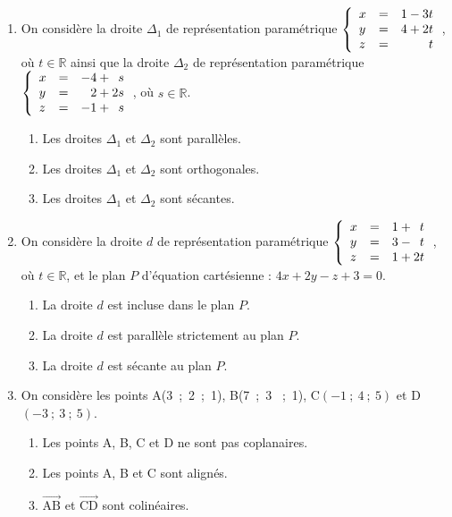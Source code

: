 \documentclass[10pt]{article}
\providecommand{\R}{\mathbb{R}}
\providecommand{\vect}[1]{\overrightarrow{#1}}
\begin{document}
\begin{enumerate}
\item On considère la droite $\Delta_1$ de représentation paramétrique 
$\left\{\begin{array}{l c l}
x &=& 1 - 3t\\
y &=& 4 + 2t\\
z &=&\phantom{4 +2}t
\end{array}\right.$, où $t \in  \R$
ainsi que la droite $\Delta_2$ de représentation paramétrique 
$\left\{\begin{array}{l c l}
x& =& -4 + \phantom{2}s\\
y& =& \phantom{-}2 + 2s\\
z& =& - 1 + \phantom{2}s
\end{array}\right.$, où $s \in \R$.
\begin{enumerate}
\item Les droites $\Delta_1$ et $\Delta_2$ sont parallèles.
\item Les droites $\Delta_1$ et $\Delta_2$ sont orthogonales.
\item Les droites $\Delta_1$ et $\Delta_2$ sont sécantes.
\end{enumerate}
\item On considère la droite $d$ de représentation paramétrique $\left\{\begin{array}{l c l}x&=&1 + \phantom{2}t\\
y &=& 3 - \phantom{2}t\\
z &=& 1 + 2t
\end{array}\right.$, où $t \in \R$,
et le plan $P$ d'équation cartésienne : $4x + 2y - z + 3 = 0.$
	\begin{enumerate}
		\item La droite $d$ est incluse dans le plan $P$.
		\item La droite $d$ est parallèle strictement au plan $P$.
		\item La droite $d$ est sécante au plan $P$.
	\end{enumerate}
\item On considère les points A(3~;~2~;~1), B(7~;~3 ~;~1), C$(-1~;~4~;~5)$ et D$(- 3~;~3~;~5)$.
	\begin{enumerate}
		\item Les points A, B, C et D ne sont pas coplanaires.
		\item Les points A, B et C sont alignés.
		\item $\vect{\text{AB}}$ et $\vect{\text{CD}}$ sont colinéaires.
	\end{enumerate}

\end{enumerate}
\end{document}

